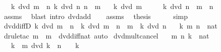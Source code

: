 \begin{isabellebody}
\ \ \ {\isachardoublequoteopen}k\ dvd\ m\ {\isacharminus}{\kern0pt}\ n{\isachardoublequoteclose}\ {\isachardoublequoteopen}k\ dvd\ n{\isachardoublequoteclose}\ {\isachardoublequoteopen}n\ {\isasymle}\ m{\isachardoublequoteclose}\isanewline
\ \ \ {\isachardoublequoteopen}k\ dvd\ m{\isachardoublequoteclose}\isanewline
%
\isadelimproof
%
\endisadelimproof
%
\isatagproof
{}\isamarkupfalse%
\ {\isacharminus}{\kern0pt}\isanewline
\ \ \isamarkupfalse%
\ {\isachardoublequoteopen}k\ dvd\ n\ {\isacharplus}{\kern0pt}\ {\isacharparenleft}{\kern0pt}m\ {\isacharminus}{\kern0pt}\ n{\isacharparenright}{\kern0pt}{\isachardoublequoteclose}\isanewline
\ \ \ \ \isamarkupfalse%
\ assms\ \isamarkupfalse%
\ {\isacharparenleft}{\kern0pt}blast\ intro{\isacharcolon}{\kern0pt}\ dvd{\isacharunderscore}{\kern0pt}add{\isacharparenright}{\kern0pt}\isanewline
\ \ \isamarkupfalse%
\ assms\ \isamarkupfalse%
\ {\isacharquery}{\kern0pt}thesis\isanewline
\ \ \ \ \isamarkupfalse%
\ simp\isanewline
{}\isamarkupfalse%
%
\endisatagproof
{\isafoldproof}%
%
\isadelimproof
\isanewline
%
\endisadelimproof
\isanewline
{}\isamarkupfalse%
\ dvd{\isacharunderscore}{\kern0pt}diffD{}{\isacharcolon}{\kern0pt}\ {\isachardoublequoteopen}k\ dvd\ m\ {\isacharminus}{\kern0pt}\ n\ {\isasymLongrightarrow}\ k\ dvd\ m\ {\isasymLongrightarrow}\ n\ {\isasymle}\ m\ {\isasymLongrightarrow}\ k\ dvd\ n{\isachardoublequoteclose}\isanewline
\ \ \ k\ m\ n\ {\isacharcolon}{\kern0pt}{\isacharcolon}{\kern0pt}\ nat\isanewline
%
\isadelimproof
\ \ %
\endisadelimproof
%
\isatagproof
{}\isamarkupfalse%
\ {\isacharparenleft}{\kern0pt}drule{\isacharunderscore}{\kern0pt}tac\ m\ {\isacharequal}{\kern0pt}\ m\ \ dvd{\isacharunderscore}{\kern0pt}diff{\isacharunderscore}{\kern0pt}nat{\isacharparenright}{\kern0pt}\ auto%
\endisatagproof
{\isafoldproof}%
%
\isadelimproof
\isanewline
%
\endisadelimproof
\isanewline
{}\isamarkupfalse%
\ dvd{\isacharunderscore}{\kern0pt}mult{\isacharunderscore}{\kern0pt}cancel{\isacharcolon}{\kern0pt}\isanewline
\ \ \ m\ n\ k\ {\isacharcolon}{\kern0pt}{\isacharcolon}{\kern0pt}\ nat\isanewline
\ \ \ {\isachardoublequoteopen}k\ {\isacharasterisk}{\kern0pt}\ m\ dvd\ k\ {\isacharasterisk}{\kern0pt}\ n{\isachardoublequoteclose}\ \ {\isachardoublequoteopen}{}\ {\isacharless}{\kern0pt}\ k{\isachardoublequoteclose}\isanewline

\end{isabellebody}
